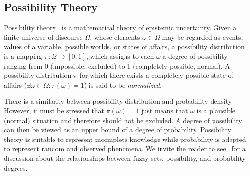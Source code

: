 \documentclass[conference]{IEEEtran}
\begin{document}
\subsection{Possibility Theory}

Possibility theory~\cite{Zadeh1978} is a mathematical theory of epistemic uncertainty.
Given a finite universe of discourse $\Omega$, whose elements $\omega\in\Omega$
may be regarded as events, values of a variable, possible worlds, or states of affairs,
a possibility distribution is a mapping $\pi: \Omega \to [0, 1]$,
which assigns to each $\omega$ a degree of possibility ranging from 0 (impossible,
excluded) to 1 (completely possible, normal).
A possibility distribution $\pi$ for  which there exists a completely possible state of
affairs ($\exists \omega \in \Omega: \pi(\omega) = 1$) is said to be \emph{normalized}.

There is a similarity between possibility distribution and probability 
density. However, it must be stressed that $\pi(\omega) = 1$ just means that
$\omega$ is a plausible (normal) situation and therefore should not be excluded.
A degree of possibility can then be viewed as an upper bound of a degree of probability.
Possibility theory is suitable to represent incomplete knowledge while 
probability is adapted to represent random and observed phenomena. 
We invite the reader to see~\cite{dubois1991} for a discussion
about the relationships between fuzzy sets, possibility, and probability 
degrees.
\end{document}
